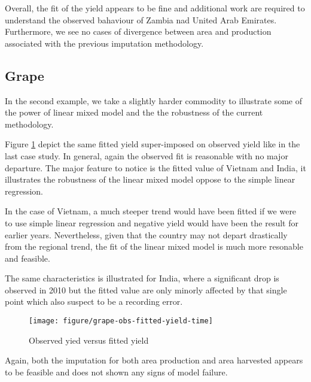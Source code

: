 \documentclass[nojss]{jss}\usepackage[]{graphicx}\usepackage[]{color}
\makeatletter
\def\maxwidth{ %
  \ifdim\Gin@nat@width>\linewidth
    \linewidth
  \else
    \Gin@nat@width
  \fi
}
\newenvironment{knitrout}{}{} %
\makeatother
\begin{document}
Overall, the fit of the yield appears to be fine and additional work
are required to understand the observed bahaviour of Zambia nad United
Arab Emirates. Furthermore, we see no cases of divergence between area
and production associated with the previous imputation methodology.


\FloatBarrier
\subsection{Grape}



In the second example, we take a slightly harder commodity to
illustrate some of the power of linear mixed model and the the
robustness of the current methodology.

Figure \ref{fig:grape-obs-fitted-yield-time} depict the same fitted
yield super-imposed on observed yield like in the last case study. In
general, again the observed fit is reasonable with no major
departure. The major feature to notice is the fitted value of Vietnam
and India, it illustrates the robustness of the linear mixed model
oppose to the simple linear regression. 

In the case of Vietnam, a much steeper trend would have been fitted if
we were to use simple linear regression and negative yield would have
been the result for earlier years. Nevertheless, given that the
country may not depart drastically from the regional trend, the fit of
the linear mixed model is much more resonable and feasible.

The same characteristics is illustrated for India, where a significant
drop is observed in 2010 but the fitted value are only minorly
affected by that single point which also suspect to be a recording
error.



\begin{knitrout}
\color{fgcolor}\begin{figure}[!ht]


{\centering \texttt{[image: figure/grape-obs-fitted-yield-time]} 

}

\caption[Observed yied versus fitted yield]{Observed yied versus fitted yield\label{fig:grape-obs-fitted-yield-time}}
\end{figure}


\end{knitrout}


Again, both the imputation for both area production and area harvested
appears to be feasible and does not shown any signs of model failure.
\end{document}
